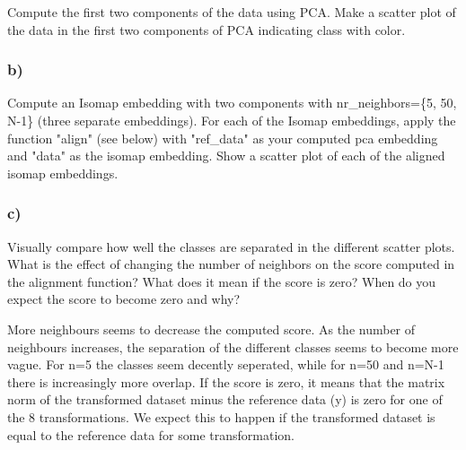 \documentclass[11pt]{article}
\begin{document}
Compute the first two components of the data using PCA. Make a scatter
plot of the data in the first two components of PCA indicating class
with color.

\subsubsection{b)}\label{b}

Compute an Isomap embedding with two components with nr\_neighbors=\{5,
50, N-1\} (three separate embeddings). For each of the Isomap
embeddings, apply the function "align" (see below) with "ref\_data" as
your computed pca embedding and "data" as the isomap embedding. Show a
scatter plot of each of the aligned isomap embeddings.

\subsubsection{c)}\label{c}

Visually compare how well the classes are separated in the different
scatter plots. What is the effect of changing the number of neighbors on
the score computed in the alignment function? What does it mean if the
score is zero? When do you expect the score to become zero and why?

More neighbours seems to decrease the computed score. As the number of
neighbours increases, the separation of the different classes seems to
become more vague. For n=5 the classes seem decently seperated, while
for n=50 and n=N-1 there is increasingly more overlap. If the score is
zero, it means that the matrix norm of the transformed dataset minus the
reference data (y) is zero for one of the 8 transformations. We expect
this to happen if the transformed dataset is equal to the reference data
for some transformation.
\end{document}

